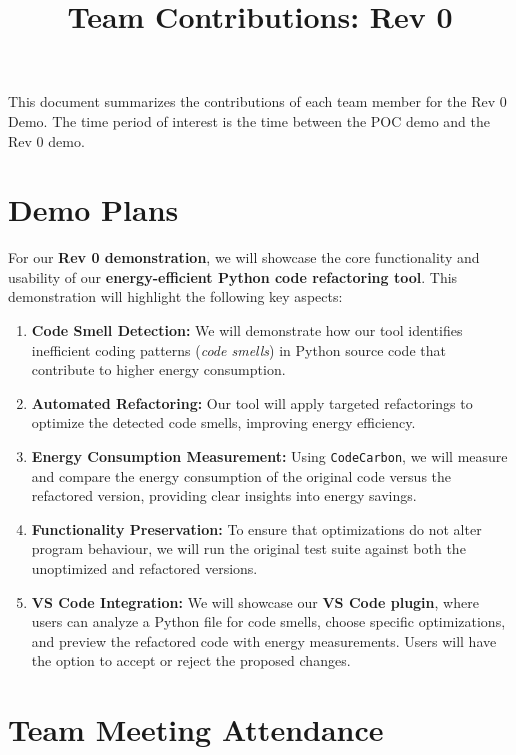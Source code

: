 \documentclass{article}
\title{Team Contributions: Rev 0\\\progname}
\author{\authname}
\date{}
\begin{document}
\maketitle

This document summarizes the contributions of each team member for the Rev 0
Demo.  The time period of interest is the time between the POC demo and the Rev
0 demo.

\section{Demo Plans}

For our \textbf{Rev 0 demonstration}, we will showcase the core
functionality and usability of our \textbf{energy-efficient Python
code refactoring tool}. This demonstration will highlight the
following key aspects:

\begin{enumerate}

  \item \textbf{Code Smell Detection:} We will demonstrate how our
    tool identifies inefficient coding patterns (\textit{code
    smells}) in Python source code that contribute to higher energy consumption.
  \item \textbf{Automated Refactoring:} Our tool will apply targeted
    refactorings to optimize the detected code smells, improving
    energy efficiency.
  \item \textbf{Energy Consumption Measurement:} Using
    \texttt{CodeCarbon}, we will measure and compare the energy
    consumption of the original code versus the refactored version,
    providing clear insights into energy savings.
  \item \textbf{Functionality Preservation:} To ensure that
    optimizations do not alter program behaviour, we will run the
    original test suite against both the unoptimized and refactored versions.
  \item \textbf{VS Code Integration:} We will showcase our \textbf{VS
    Code plugin}, where users can analyze a Python file for code
    smells, choose specific optimizations, and preview the refactored
    code with energy measurements. Users will have the option to
    accept or reject the proposed changes.

\end{enumerate}

\section{Team Meeting Attendance}
\end{document}
